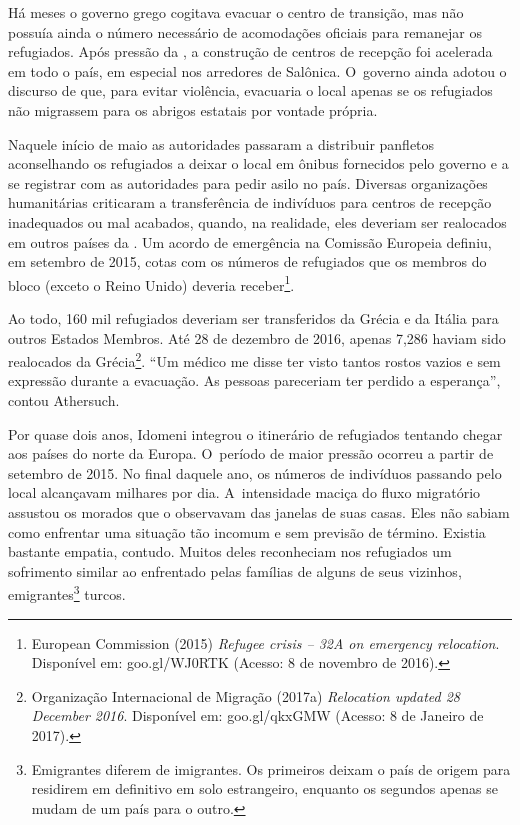 Há meses o governo grego cogitava evacuar o centro de transição, mas não
possuía ainda o número necessário de acomodações oficiais para remanejar
os refugiados. Após pressão da , a construção de centros de recepção
foi acelerada em todo o país, em especial nos arredores de Salônica. O~governo ainda adotou o discurso de que, para evitar violência, evacuaria
o local apenas se os refugiados não migrassem para os abrigos estatais
por vontade própria.

Naquele início de maio as autoridades passaram a distribuir panfletos
aconselhando os refugiados a deixar o local em ônibus fornecidos pelo
governo e a se registrar com as autoridades para pedir asilo no
país. Diversas organizações humanitárias criticaram a transferência de
indivíduos para centros de recepção inadequados ou mal acabados, quando,
na realidade, eles deveriam ser realocados em outros países da . Um
acordo de emergência na Comissão Europeia definiu, em setembro de 2015,
cotas com os números de refugiados que os membros do bloco (exceto o
Reino Unido) deveria receber\footnote{ European Commission (2015) \emph{Refugee crisis
-- 32A on emergency relocation}. Disponível em:
goo.gl/WJ0RTK
(Acesso: 8
de novembro de 2016).}.

Ao todo, 160 mil refugiados deveriam ser transferidos da Grécia e da
Itália para outros Estados Membros. Até 28 de dezembro de 2016, apenas
7,286 haviam sido realocados da Grécia\footnote{ Organização Internacional de Migração (2017a)
\emph{Relocation updated 28 December 2016}. Disponível em:
goo.gl/qkxGMW
(Acesso: 8 de Janeiro de 2017).}. ``Um médico me
disse ter visto tantos rostos vazios e sem expressão durante a
evacuação. As pessoas pareceriam ter perdido a esperança'', contou
Athersuch.

Por quase dois anos, Idomeni integrou o itinerário de refugiados
tentando chegar aos países do norte da Europa. O~período de maior
pressão ocorreu a partir de setembro de 2015. No final daquele ano, os
números de indivíduos passando pelo local alcançavam milhares por dia. A~intensidade maciça do fluxo migratório assustou
os morados que o observavam das janelas de suas casas.
Eles não sabiam como enfrentar uma situação
tão incomum e sem previsão de término. Existia bastante empatia,
contudo. Muitos deles reconheciam nos refugiados um sofrimento similar
ao enfrentado pelas famílias de alguns de seus vizinhos,
emigrantes\footnote{ Emigrantes diferem de imigrantes. Os primeiros
deixam o país de origem para residirem em definitivo em solo
estrangeiro, enquanto os segundos apenas se mudam de um país para o
outro.}  turcos.

